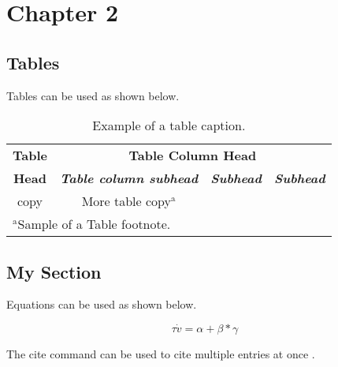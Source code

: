 \chapter{Chapter 2}
\label{chap:ch2}

\section{Tables}
Tables can be used as shown below.

\begin{table}[htbp]
 \caption{Example of a table caption.}
 \begin{center}
  \begin{tabular}{|c|c|c|c|}
   \hline
   \textbf{Table} & \multicolumn{3}{|c|}{\textbf{Table Column Head}}                                                         \\
   \cline{2-4}
   \textbf{Head}  & \textbf{\textit{Table column subhead}}           & \textbf{\textit{Subhead}} & \textbf{\textit{Subhead}} \\
   \hline
   copy           & More table copy$^{\mathrm{a}}$                   &                           &                           \\
   \hline
   \multicolumn{4}{l}{$^{\mathrm{a}}$Sample of a Table footnote.}
  \end{tabular}
  \label{tb:table}
 \end{center}
\end{table}


\section{My Section}
\label{sec:my}
Equations can be used as shown below.

\begin{equation}
 \tau \dot{v} = \alpha + \beta * \gamma
\end{equation}

The cite command can be used to cite multiple entries at once \cite{gree00,phil99,jame76}.
